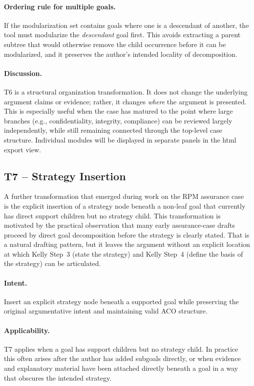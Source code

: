 \documentclass{article}
\begin{document}
\paragraph{Ordering rule for multiple goals.}
If the modularization set contains goals where one is a descendant of another, the tool must modularize the \emph{descendant} goal first.
This avoids extracting a parent subtree that would otherwise remove the child occurrence before it can be modularized, and it preserves the author's intended locality of decomposition.

\paragraph{Discussion.}
T6 is a structural organization transformation.
It does not change the underlying argument claims or evidence; rather, it changes \emph{where} the argument is presented.
This is especially useful when the case has matured to the point where large branches (e.g., confidentiality, integrity, compliance) can be reviewed largely independently, while still remaining connected through the top-level case structure.
Individual modules will be displayed in separate panels in the html export view.

\subsection{T7 -- Strategy Insertion}\label{sec:t7}

A further transformation that emerged during work on the RPM assurance case is the explicit insertion of a strategy node beneath a non-leaf goal that currently has direct support children but no strategy child.
This transformation is motivated by the practical observation that many early assurance-case drafts proceed by direct goal decomposition before the strategy is clearly stated.
That is a natural drafting pattern, but it leaves the argument without an explicit location at which Kelly Step~3 (state the strategy) and Kelly Step~4 (define the basis of the strategy) can be articulated.

\paragraph{Intent.}
Insert an explicit strategy node beneath a supported goal while preserving the original argumentative intent and maintaining valid ACO structure.

\paragraph{Applicability.}
T7 applies when a goal has support children but no strategy child.
In practice this often arises after the author has added subgoals directly, or when evidence and explanatory material have been attached directly beneath a goal in a way that obscures the intended strategy.
\end{document}
